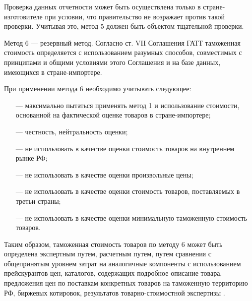 Проверка данных отчетности может быть осуществлена только в стране-изготовителе при условии, что правительство не возражает против такой проверки. Учитывая это, метод 5 должен быть объектом тщательной проверки.

Метод 6 --- резервный метод. Согласно ст. VII Соглашения ГАТТ таможенная стоимость определяется с использованием разумных способов, совместимых с принципами и общими условиями этого Соглашения и на базе данных, имеющихся в стране-импортере.

При применении метода 6 необходимо учитывать следующее:
\begin{enumerate}
	\item [---] максимально пытаться применять метод 1 и использование стоимости, основанной на фактической оценке товаров в стране-импортере;
	\item [---] честность, нейтральность оценки;
	\item [---] не использовать в качестве оценки стоимость товаров на внутреннем рынке РФ;
	\item [---] не использовать в качестве оценки произвольные цены;
	\item [---] не использовать в качестве оценки стоимость товаров, поставляемых в третьи страны;
	\item [---] не использовать в качестве оценки минимальную таможенную стоимость товаров.
\end{enumerate}

Таким образом, таможенная стоимость товаров по методу 6 может быть определена экспертным путем, расчетным путем, путем сравнения с общепринятым уровнем затрат на аналогичные компоненты с использованием прейскурантов цен, каталогов, содержащих подробное описание товара, предложения цен по поставкам конкретных товаров на таможенную территорию РФ, биржевых котировок, результатов товарно-стоимостной экспертизы \cite[с. 131--132]{novikova}.





















